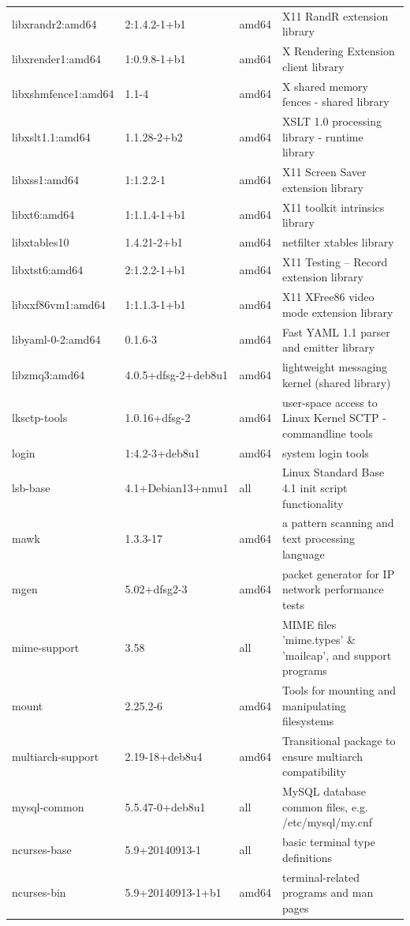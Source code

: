 \documentclass[a4paper,10pt]{article}
\begin{document}
\begin{appendices}
{\begin{longtable}{p{3.25cm}@{\hspace{0.25cm}}p{4cm}@{\hspace{0.25cm}}l@{\hspace{0.25cm}}p{7cm}}
libxrandr2:amd64	&	2:1.4.2-1+b1	&	amd64	&	X11 RandR extension library	\\
libxrender1:amd64	&	1:0.9.8-1+b1	&	amd64	&	X Rendering Extension client library	\\
libxshmfence1:amd64	&	1.1-4	&	amd64	&	X shared memory fences - shared library	\\
libxslt1.1:amd64	&	1.1.28-2+b2	&	amd64	&	XSLT 1.0 processing library - runtime library	\\
libxss1:amd64	&	1:1.2.2-1	&	amd64	&	X11 Screen Saver extension library	\\
libxt6:amd64	&	1:1.1.4-1+b1	&	amd64	&	X11 toolkit intrinsics library	\\
libxtables10	&	1.4.21-2+b1	&	amd64	&	netfilter xtables library	\\
libxtst6:amd64	&	2:1.2.2-1+b1	&	amd64	&	X11 Testing -- Record extension library	\\
libxxf86vm1:amd64	&	1:1.1.3-1+b1	&	amd64	&	X11 XFree86 video mode extension library	\\
libyaml-0-2:amd64	&	0.1.6-3	&	amd64	&	Fast YAML 1.1 parser and emitter library	\\
libzmq3:amd64	&	4.0.5+dfsg-2+deb8u1	&	amd64	&	lightweight messaging kernel (shared library)	\\
lksctp-tools	&	1.0.16+dfsg-2	&	amd64	&	user-space access to Linux Kernel SCTP - commandline tools	\\
login	&	1:4.2-3+deb8u1	&	amd64	&	system login tools	\\
lsb-base	&	4.1+Debian13+nmu1	&	all	&	Linux Standard Base 4.1 init script functionality	\\
mawk	&	1.3.3-17	&	amd64	&	a pattern scanning and text processing language	\\
mgen	&	5.02+dfsg2-3	&	amd64	&	packet generator for IP network performance tests	\\
mime-support	&	3.58	&	all	&	MIME files 'mime.types' \& 'mailcap', and support programs	\\
mount	&	2.25.2-6	&	amd64	&	Tools for mounting and manipulating filesystems	\\
multiarch-support	&	2.19-18+deb8u4	&	amd64	&	Transitional package to ensure multiarch compatibility	\\
mysql-common	&	5.5.47-0+deb8u1	&	all	&	MySQL database common files, e.g. /etc/mysql/my.cnf	\\
ncurses-base	&	5.9+20140913-1	&	all	&	basic terminal type definitions	\\
ncurses-bin	&	5.9+20140913-1+b1	&	amd64	&	terminal-related programs and man pages	\\

\end{longtable}}
\end{appendices}
\end{document}
